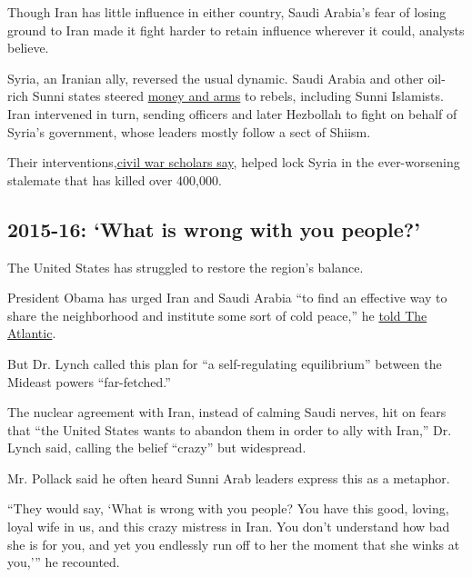 Though Iran has little influence in either country, Saudi Arabia's fear
of losing ground to Iran made it fight harder to retain influence
wherever it could, analysts believe.

Syria, an Iranian ally, reversed the usual dynamic. Saudi Arabia and
other oil-rich Sunni states steered
\href{https://www.ft.com/content/f2d9bbc8-bdbc-11e2-890a-00144feab7de}{money
and arms} to rebels, including Sunni Islamists. Iran intervened in turn,
sending officers and later Hezbollah to fight on behalf of Syria's
government, whose leaders mostly follow a sect of Shiism.

Their
interventions,\href{http://www.nytimes.com/2016/08/27/world/middleeast/syria-civil-war-why-get-worse.html?rref=collection\%2Fcolumn\%2Fthe-interpreter\&action=click\&contentCollection=world\&region=stream\&module=stream_unit\&version=latest\&contentPlacement=8\&pgtype=collection}{civil
war scholars say}, helped lock Syria in the ever-worsening stalemate
that has killed over 400,000.

\hypertarget{2015-16-what-is-wrong-with-you-people}{%
\subsection{2015-16: `What is wrong with you
people?'}\label{2015-16-what-is-wrong-with-you-people}}

The United States has struggled to restore the region's balance.

President Obama has urged Iran and Saudi Arabia ``to find an effective
way to share the neighborhood and institute some sort of cold peace,''
he
\href{http://www.theatlantic.com/magazine/archive/2016/04/the-obama-doctrine/471525/}{told
The Atlantic}.

But Dr. Lynch called this plan for ``a self-regulating equilibrium''
between the Mideast powers ``far-fetched.''

The nuclear agreement with Iran, instead of calming Saudi nerves, hit on
fears that ``the United States wants to abandon them in order to ally
with Iran,'' Dr. Lynch said, calling the belief ``crazy'' but
widespread.

Mr. Pollack said he often heard Sunni Arab leaders express this as a
metaphor.

``They would say, `What is wrong with you people? You have this good,
loving, loyal wife in us, and this crazy mistress in Iran. You don't
understand how bad she is for you, and yet you endlessly run off to her
the moment that she winks at you,''' he recounted.

